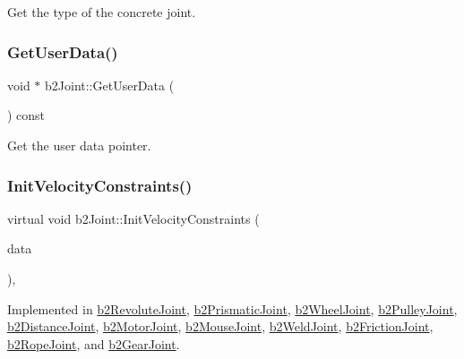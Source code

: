 Get the type of the concrete joint. 

\mbox{\label{classb2_joint_a798c593c7a4958d408bca10f3b3788f9}} 
\subsubsection{\texorpdfstring{GetUserData()}{GetUserData()}}
{\footnotesize\ttfamily void $\ast$ b2\+Joint\+::\+Get\+User\+Data (\begin{DoxyParamCaption}{ }\end{DoxyParamCaption}) const\hspace{0.3cm}{\ttfamily [inline]}}



Get the user data pointer. 

\mbox{\label{classb2_joint_a599c013de5514e02684b958b31dd76a4}} 
\subsubsection{\texorpdfstring{InitVelocityConstraints()}{InitVelocityConstraints()}}
{\footnotesize\ttfamily virtual void b2\+Joint\+::\+Init\+Velocity\+Constraints (\begin{DoxyParamCaption}\item[{const \mbox{\hyperlink{structb2_solver_data}{b2\+Solver\+Data}} \&}]{data }\end{DoxyParamCaption})\hspace{0.3cm}{\ttfamily [protected]}, {}}



Implemented in \mbox{\hyperlink{classb2_revolute_joint_a5ddddb865cc297c66721ae443bfb40a4}{b2\+Revolute\+Joint}}, \mbox{\hyperlink{classb2_prismatic_joint_a840e9885d49bf621c46df79733df21dc}{b2\+Prismatic\+Joint}}, \mbox{\hyperlink{classb2_wheel_joint_a557c58a58cdf75d5b2c14c7f75a37575}{b2\+Wheel\+Joint}}, \mbox{\hyperlink{classb2_pulley_joint_a1826611f1dfe6284c3ce3afdab875e94}{b2\+Pulley\+Joint}}, \mbox{\hyperlink{classb2_distance_joint_abe956dd5951651b36321098416ad99fd}{b2\+Distance\+Joint}}, \mbox{\hyperlink{classb2_motor_joint_aeffac9d1e3940c362962319d1bdb3f22}{b2\+Motor\+Joint}}, \mbox{\hyperlink{classb2_mouse_joint_a02c342a98cfa5687de2bd3dba7c700b1}{b2\+Mouse\+Joint}}, \mbox{\hyperlink{classb2_weld_joint_afb54f848fe19f33555f01594e3e4f410}{b2\+Weld\+Joint}}, \mbox{\hyperlink{classb2_friction_joint_afce4006666e83c50d2017b5ff5e7ca2d}{b2\+Friction\+Joint}}, \mbox{\hyperlink{classb2_rope_joint_a8a9bd57a12aaf38b529ae626e714e1e8}{b2\+Rope\+Joint}}, and \mbox{\hyperlink{classb2_gear_joint_ac3c76db6940bcb4c94d564960b9c57ab}{b2\+Gear\+Joint}}.

